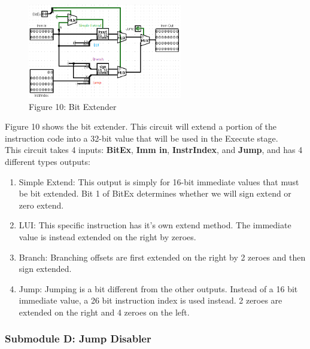 \documentclass{article}
\begin{document}
\begin{figure}
\vspace{-1.4cm}
\begin{center}
\includegraphics[width=0.6\textwidth]{BitExtend.png} \\
Figure 10: Bit Extender
\end{center}
\vspace{-1.4cm}
\end{figure}
Figure 10 shows the bit extender. This circuit will extend a portion of the instruction code into a 32-bit value that will be used in the Execute stage. \\
This circuit takes 4 inputs: \textbf{BitEx}, \textbf{Imm in}, \textbf{InstrIndex}, and \textbf{Jump}, and has 4 different types outputs:
\begin{enumerate}
\item
Simple Extend: This output is simply for 16-bit immediate values that must be bit extended. Bit 1 of BitEx determines whether we will sign extend or zero extend.

\item
LUI: This specific instruction has it's own extend method. The immediate value is instead extended on the right by zeroes.
\end{enumerate}

\begin{enumerate}
\setcounter{enumi}{2}
\item
Branch: Branching offsets are first extended on the right by 2 zeroes and then sign extended.

\item
Jump: Jumping is a bit different from the other outputs. Instead of a 16 bit immediate value, a 26 bit instruction index is used instead. 2 zeroes are extended on the right and 4 zeroes on the left.
\end{enumerate}

\subsubsection{Submodule D: Jump Disabler}
\end{document}

